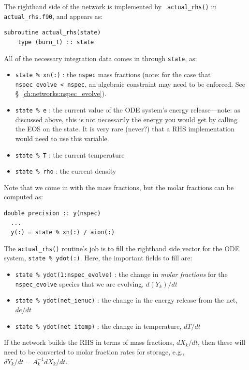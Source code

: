 The righthand side of the network is implemented by {\tt
  actual\_rhs()} in {\tt actual\_rhs.f90}, and appears as:
\begin{lstlisting}[language={[95]fortran}]
  subroutine actual_rhs(state)
    type (burn_t) :: state
\end{lstlisting}

All of the necessary integration data comes in through {\tt state}, as:
\begin{itemize}
\item {\tt state \% xn(:)} : the {\tt nspec} mass fractions (note: for
  the case that {\tt nspec\_evolve < nspec}, an algebraic constraint
  may need to be enforced.  See \S~\ref{ch:networks:nspec_evolve}).

\item {\tt state \% e} : the current value of the ODE system's energy
  release---note: as discussed above, this is not necessarily the energy
  you would get by calling the EOS on the state.  It is very rare (never?)
  that a RHS implementation would need to use this variable.

\item {\tt state \% T} : the current temperature

\item {\tt state \% rho} : the current density
\end{itemize}
Note that we come in with the mass fractions, but the molar fractions can
be computed as:
\begin{lstlisting}[language={[95]fortran}]
  double precision :: y(nspec)
  ...
  y(:) = state % xn(:) / aion(:)
\end{lstlisting}

The {\tt actual\_rhs()} routine's job is to fill the righthand side vector
for the ODE system, {\tt state \% ydot(:)}.  Here, the important
fields to fill are:
\begin{itemize}
\item {\tt state \% ydot(1:nspec\_evolve)} : the change in {\em molar
  fractions} for the {\tt nspec\_evolve} species that we are evolving,
  $d({Y}_k)/dt$

\item {\tt state \% ydot(net\_ienuc)} : the change in the energy release
  from the net, $de/dt$

\item {\tt state \% ydot(net\_itemp)} : the change in temperature, $dT/dt$
\end{itemize}

If the network builds the RHS in terms of mass fractions, $dX_k/dt$, then
these will need to be converted to molar fraction rates for storage, e.g.,
$dY_k/dt = A_k^{-1} dX_k/dt$.


